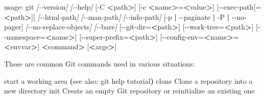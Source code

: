 \documentclass[
]{book}
\newenvironment{Shaded}{\begin{snugshade}}{\end{snugshade}}
\newcommand{\ErrorTok}[1]{\textcolor[rgb]{0.64,0.00,0.00}{\textbf{#1}}}
\newcommand{\ExtensionTok}[1]{#1}
\newcommand{\KeywordTok}[1]{\textcolor[rgb]{0.13,0.29,0.53}{\textbf{#1}}}
\newcommand{\NormalTok}[1]{#1}
\newcommand{\OperatorTok}[1]{\textcolor[rgb]{0.81,0.36,0.00}{\textbf{#1}}}
\newcommand{\PreprocessorTok}[1]{\textcolor[rgb]{0.56,0.35,0.01}{\textit{#1}}}
\newcommand{\SpecialStringTok}[1]{\textcolor[rgb]{0.31,0.60,0.02}{#1}}
\begin{document}
\begin{Shaded}
\begin{Highlighting}[]
\ExtensionTok{usage:}\NormalTok{ git }\PreprocessorTok{[{-}{-}}\SpecialStringTok{version}\PreprocessorTok{]} \PreprocessorTok{[{-}{-}}\SpecialStringTok{help}\PreprocessorTok{]}\NormalTok{ [{-}C }\OperatorTok{\textless{}}\NormalTok{path}\OperatorTok{\textgreater{}}\NormalTok{] [{-}c }\OperatorTok{\textless{}}\NormalTok{name}\OperatorTok{\textgreater{}}\NormalTok{=}\OperatorTok{\textless{}}\NormalTok{value}\OperatorTok{\textgreater{}}\NormalTok{]}
           \ExtensionTok{[{-}{-}exec{-}path[=}\OperatorTok{\textless{}}\NormalTok{path}\OperatorTok{\textgreater{}}\NormalTok{]] }\PreprocessorTok{[{-}{-}}\SpecialStringTok{html}\PreprocessorTok{{-}}\SpecialStringTok{path}\PreprocessorTok{]} \PreprocessorTok{[{-}{-}}\SpecialStringTok{man}\PreprocessorTok{{-}}\SpecialStringTok{path}\PreprocessorTok{]} \PreprocessorTok{[{-}{-}}\SpecialStringTok{info}\PreprocessorTok{{-}}\SpecialStringTok{path}\PreprocessorTok{]}
           \ExtensionTok{[{-}p} \KeywordTok{|} \ExtensionTok{{-}{-}paginate} \KeywordTok{|} \ExtensionTok{{-}P} \KeywordTok{|} \ExtensionTok{{-}{-}no{-}pager]} \PreprocessorTok{[{-}{-}}\SpecialStringTok{no}\PreprocessorTok{{-}}\SpecialStringTok{replace}\PreprocessorTok{{-}}\SpecialStringTok{objects}\PreprocessorTok{]} \PreprocessorTok{[{-}{-}}\SpecialStringTok{bare}\PreprocessorTok{]}
           \ExtensionTok{[{-}{-}git{-}dir=}\OperatorTok{\textless{}}\NormalTok{path}\OperatorTok{\textgreater{}}\NormalTok{] [{-}{-}work{-}tree=}\OperatorTok{\textless{}}\NormalTok{path}\OperatorTok{\textgreater{}}\NormalTok{] [{-}{-}namespace=}\OperatorTok{\textless{}}\NormalTok{name}\OperatorTok{\textgreater{}}\NormalTok{]}
           \ExtensionTok{[{-}{-}super{-}prefix=}\OperatorTok{\textless{}}\NormalTok{path}\OperatorTok{\textgreater{}}\NormalTok{] [{-}{-}config{-}env=}\OperatorTok{\textless{}}\NormalTok{name}\OperatorTok{\textgreater{}}\NormalTok{=}\OperatorTok{\textless{}}\NormalTok{envvar}\OperatorTok{\textgreater{}}\NormalTok{]}
           \OperatorTok{\textless{}}\NormalTok{command}\OperatorTok{\textgreater{}} \ExtensionTok{[}\OperatorTok{\textless{}}\NormalTok{args}\OperatorTok{\textgreater{}}\NormalTok{]}

\ExtensionTok{These}\NormalTok{ are common Git commands used in various situations:}

\ExtensionTok{start}\NormalTok{ a working area }\ErrorTok{(}\ExtensionTok{see}\NormalTok{ also: git help tutorial}\KeywordTok{)}
   \ExtensionTok{clone}\NormalTok{     Clone a repository into a new directory}
   \ExtensionTok{init}\NormalTok{      Create an empty Git repository or reinitialize an existing one}


\end{Highlighting}
\end{Shaded}
\end{document}
